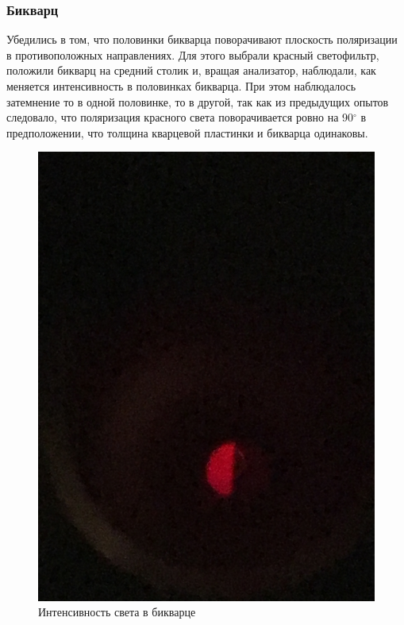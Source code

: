 \subsubsection{Бикварц}
Убедились в том, что половинки бикварца поворачивают плоскость поляризации в противоположных направлениях. Для этого выбрали красный светофильтр, положили бикварц на средний столик и, вращая анализатор, наблюдали, как меняется интенсивность в половинках бикварца. При этом наблюдалось затемнение то в одной половинке, то в другой, так как из предыдущих опытов следовало, что поляризация красного света поворачивается ровно на 90$ ^\circ $ в предположении, что толщина кварцевой пластинки и бикварца одинаковы.
\begin{figure}[h!]
	\caption{Интенсивность света в бикварце}
	\centering
	\begin{minipage}{0.3\linewidth}
		\includegraphics[width=\linewidth]{biquarz/red-l.jpg}
	\end{minipage}
	\begin{minipage}{0.3\linewidth}

\end{minipage}
\end{figure}

